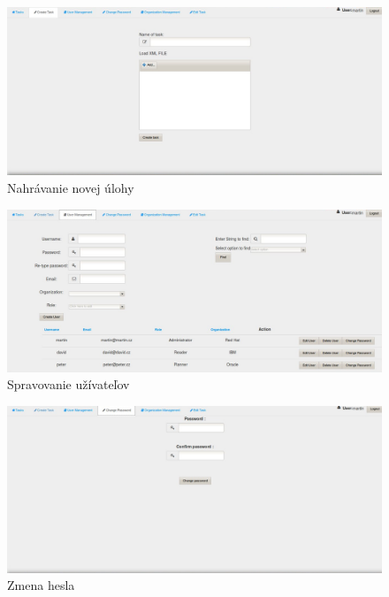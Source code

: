 {\begin{figure}[htb]
\begin{center}
\includegraphics[scale=0.5]{page1.jpg} 
\caption{Nahrávanie novej úlohy}


\end{center}

\end{figure}

\begin{figure}[htb]

\begin{center}

\includegraphics[scale=0.5]{page2.jpg} 
\caption{Spravovanie užívateľov}


\end{center}

\end{figure}


\begin{figure}[htb]

\begin{center}

\includegraphics[scale=0.5]{page3.jpg} 
\caption{Zmena hesla}



\end{center}
\end{figure}}

